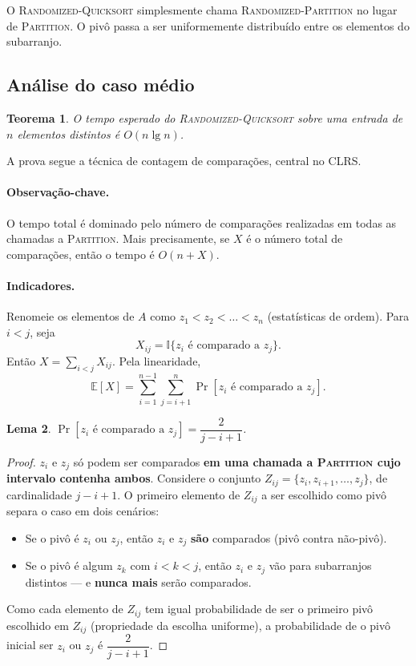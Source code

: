 \documentclass[9pt,a4paper]{extarticle}
\newcommand{\impt}[1]{\textcolor{important}{#1}}
\newtheorem{theorem}{Teorema}[section]
\newtheorem{lemma}[theorem]{Lema}
\theoremstyle{definition}
\begin{document}
O \textsc{Randomized-Quicksort} simplesmente chama
\textsc{Randomized-Partition} no lugar de \textsc{Partition}. O pivô passa
a ser uniformemente distribuído entre os elementos do subarranjo.

\subsection{Análise do caso médio}

\begin{theorem}\label{teo:qsort-medio}
O tempo esperado do \textsc{Randomized-Quicksort} sobre uma entrada de
$n$ elementos distintos é $O(n\lg n)$.
\end{theorem}

A prova segue a técnica de \impt{contagem de comparações}, central no
CLRS.

\paragraph{Observação-chave.} O tempo total é dominado pelo número de
comparações realizadas em todas as chamadas a \textsc{Partition}. Mais
precisamente, se $X$ é o número total de comparações, então o tempo é
$O(n + X)$.

\paragraph{Indicadores.} Renomeie os elementos de $A$ como $z_1 < z_2 <
\dots < z_n$ (estatísticas de ordem). Para $i < j$, seja
\[
  X_{ij} = \mathbb{I}\{z_i \text{ é comparado a } z_j\}.
\]
Então $X = \sum_{i<j} X_{ij}$. Pela linearidade,
\[
  \mathbb{E}[X] = \sum_{i=1}^{n-1}\sum_{j=i+1}^{n} \Pr[z_i\text{ é comparado a }z_j].
\]

\begin{lemma}\label{lem:prob-comparacao}
$\Pr[z_i\text{ é comparado a }z_j] = \dfrac{2}{j - i + 1}$.
\end{lemma}

\begin{proof}
$z_i$ e $z_j$ só podem ser comparados \textbf{em uma chamada a
\textsc{Partition} cujo intervalo contenha ambos}. Considere o conjunto
$Z_{ij} = \{z_i, z_{i+1}, \dots, z_j\}$, de cardinalidade $j - i + 1$. O
primeiro elemento de $Z_{ij}$ a ser escolhido como pivô separa o caso
em dois cenários:
\begin{itemize}
  \item Se o pivô é $z_i$ ou $z_j$, então $z_i$ e $z_j$ \textbf{são}
    comparados (pivô contra não-pivô).
  \item Se o pivô é algum $z_k$ com $i < k < j$, então $z_i$ e $z_j$
    vão para subarranjos distintos --- e \textbf{nunca mais} serão
    comparados.
\end{itemize}
Como cada elemento de $Z_{ij}$ tem igual probabilidade de ser o primeiro
pivô escolhido em $Z_{ij}$ (propriedade da escolha uniforme), a
probabilidade de o pivô inicial ser $z_i$ ou $z_j$ é
$\dfrac{2}{j - i + 1}$.
\end{proof}
\end{document}
